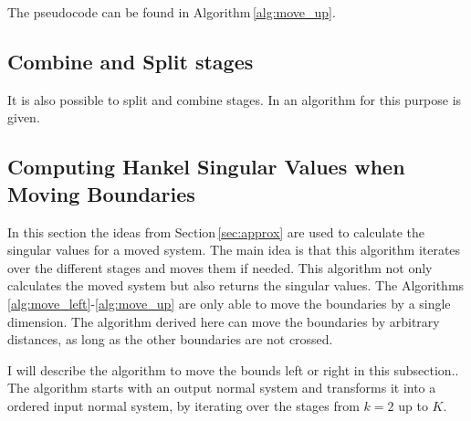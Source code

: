 \documentclass[doctype=mastersthesis,BCOR=15mm,biblatex]{ldvbook}%
\begin{document}
The pseudocode can be found in Algorithm\,\ref{alg:move_up}.

\FloatBarrier

\subsection{Combine and Split stages}
It is also possible to split and combine stages. In \cite{chandrasekaran_fast_2005} an algorithm for this purpose is given.
\FloatBarrier
\subsection{Computing Hankel Singular Values when Moving Boundaries}\label{subsec:move_sig}
In this section the ideas from Section\,\ref{sec:approx} are used to calculate the singular values for a moved system.
The main idea is that this algorithm iterates over the different stages and moves them if needed.
This algorithm not only calculates the moved system but also returns the singular values.
The Algorithms\,\ref{alg:move_left}-\ref{alg:move_up} are only able to move the boundaries by a single dimension.
The algorithm derived here can move the boundaries by arbitrary distances, as long as the other boundaries are not crossed. 


I will describe the algorithm to move the bounds left or right in this subsection.. 
The algorithm starts with an output normal system and transforms it into a ordered input normal system, by iterating over the stages from $k=2$ up to $K$.
\end{document}
